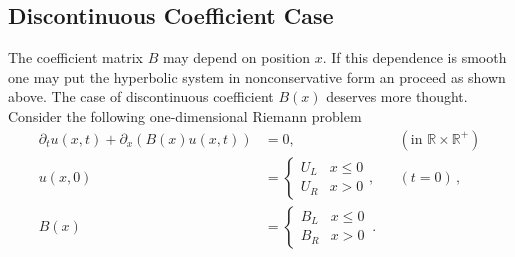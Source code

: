 \documentclass[a4paper,12pt]{article}
\theoremstyle{definition}
\theoremstyle{definition}
\begin{document}
\subsection*{Discontinuous Coefficient Case}

The coefficient matrix $B$ may depend on position $x$. If this dependence is smooth
one may put the hyperbolic system in nonconservative form an proceed as shown
above. The case of discontinuous coefficient $B(x)$ deserves more thought.
Consider the following one-dimensional Riemann problem
\begin{subequations}
	\begin{align}\label{eq:DiscontinuousRiemann}
	\partial_t u(x,t) + \partial_x (B(x) u(x,t)) &= 0, &&(\text{in $\mathbb{R}\times\mathbb{R}^+$})\\
	u(x,0) &= \left\{\begin{array}{ll}
	U_L & x \leq 0\\ U_R & x > 0
	\end{array}\right ., &&(t=0)\,,\\
	B(x) &= \left\{\begin{array}{ll}
	B_L & x \leq 0\\ B_R & x > 0
	\end{array}\right. \,.
	\end{align}
\end{subequations}
\end{document}

